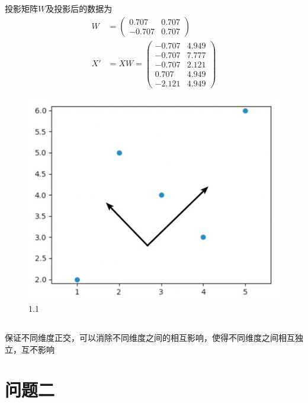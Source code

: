 \documentclass[12pt, a4paper]{article}
\begin{document}
投影矩阵$W$及投影后的数据为
\begin{align*}
    W&=\begin{pmatrix}
        0.707&0.707\\-0.707&0.707
    \end{pmatrix}\\
    X'&=XW=\begin{pmatrix}
        -0.707&4.949\\-0.707&7.777\\-0.707&2.121\\0.707&4.949\\-2.121&4.949
    \end{pmatrix}
\end{align*}

\begin{figure}
    \centering
    \includegraphics*{img/a5_1.jpg}
    \caption{1.1}
\end{figure}

\subsection{}

保证不同维度正交，可以消除不同维度之间的相互影响，使得不同维度之间相互独立，互不影响


\section{问题二}

\subsection{}
\end{document}
